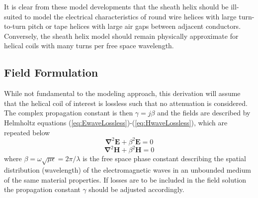 It is clear from these model developments that the sheath helix should be ill-suited to model the electrical characteristics of round wire helices with large turn-to-turn pitch or tape helices with large air gaps between adjacent conductors. Conversely, the sheath helix model should remain physically approximate for helical coils with many turns per free space wavelength. 

\subsection{Field Formulation}
While not fundamental to the modeling approach, this derivation will assume that the helical coil of interest is lossless such that no attenuation is considered. The complex propagation constant is then $\gamma=j\beta$ and the fields are described by Helmholtz equations (\ref{eq:EwaveLossless})-(\ref{eq:HwaveLossless}), which are repeated below
\begin{equation}\label{eq:helmholtz1}
	\mathbf{\nabla}^2\mathbf{E} + \beta^2 \mathbf{E} = 0
\end{equation}
\begin{equation}\label{eq:helmholtz2}
	\mathbf{\nabla}^2\mathbf{H} + \beta^2 \mathbf{H} = 0
\end{equation}
where $\beta=\omega\sqrt{\mu\epsilon} = 2\pi/\lambda$ is the free space phase constant describing the spatial distribution (wavelength) of the electromagnetic waves in an unbounded medium of the same material properties. If losses are to be included in the field solution the propagation constant $\gamma$ should be adjusted accordingly. 

